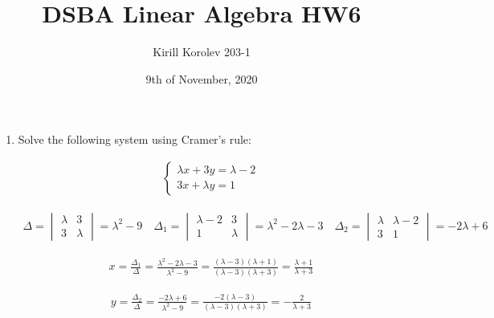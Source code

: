 \documentclass{article}
\title{DSBA Linear Algebra HW6}
\author{Kirill Korolev 203-1}
\date{9th of November, 2020}
\begin{document}
\maketitle

\begin{enumerate}

\item Solve the following system using Cramer’s rule:

\begin{align*}
\begin{cases}
\lambda x + 3y=\lambda - 2\\
3x+\lambda y=1
\end{cases}
\end{align*}

\begin{align*}
\Delta = \begin{vmatrix}
\lambda & 3\\
3 & \lambda
\end{vmatrix}=\lambda^2-9 \quad
\Delta_1 = \begin{vmatrix}
\lambda - 2 & 3\\
1 & \lambda
\end{vmatrix}=\lambda^2-2\lambda-3 \quad
\Delta_2 = \begin{vmatrix}
\lambda & \lambda-2\\
3 & 1
\end{vmatrix}=-2\lambda+6
\end{align*}

\begin{align*}
x = \frac{\Delta_1}{\Delta} = \frac{\lambda^2-2\lambda-3}{\lambda^2-9}=\frac{(\lambda-3)(\lambda+1)}{(\lambda-3)(\lambda+3)}=\frac{\lambda+1}{\lambda+3}
\end{align*}

\begin{align*}
y = \frac{\Delta_2}{\Delta} = \frac{-2\lambda+6}{\lambda^2-9}=\frac{-2(\lambda-3)}{(\lambda-3)(\lambda+3)}=-\frac{2}{\lambda+3}
\end{align*}

\end{enumerate}
\end{document}
